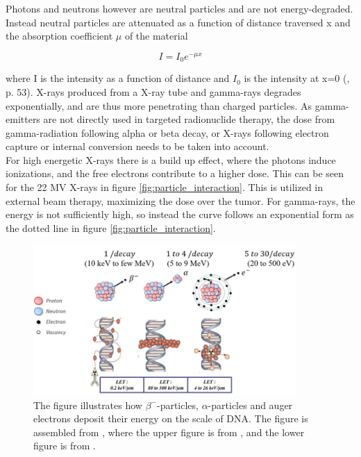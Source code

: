 Photons and neutrons however are neutral particles and are not energy-degraded. Instead neutral particles are attenuated as a function of distance traversed x and the absorption coefficient $\mu$ of the material 

\begin{equation} \label{eq:photon_attenuation}
    I = I_0 e^{-\mu x}
\end{equation}

where I is the intensity as a function of distance and $I_0$ is the intensity at x=0 (\cite{Leo1994}, p. 53). X-rays produced from a X-ray tube and gamma-rays degrades exponentially, and are thus more penetrating than charged particles. As gamma-emitters are not directly used in targeted  radionuclide therapy, the dose from gamma-radiation following alpha or beta decay, or X-rays following electron capture or internal conversion needs to be taken into account.\\
For high energetic X-rays there is a build up effect, where the photons induce ionizations, and the free electrons contribute to a higher dose. This can be seen for the 22 MV X-rays in figure \ref{fig:particle_interaction}. This is utilized in external beam therapy, maximizing the dose over the tumor. For gamma-rays, the energy is not sufficiently high, so instead the curve follows an exponential form as the dotted line in figure \ref{fig:particle_interaction}.   \\


\begin{figure}
    \centering
    \includegraphics[width=10cm]{Theory/DNA_LET.jpg}
    \caption{The figure illustrates how $\beta^-$-particles, $\alpha$-particles and auger electrons deposit their energy on the scale of DNA. The figure is assembled from \cite{Alotiby2019}, where the upper figure is from \cite{Hillyar2015}, and the lower figure is from \cite{Pouget2011}. 
    }
    \label{fig:DNA_let}
\end{figure}


